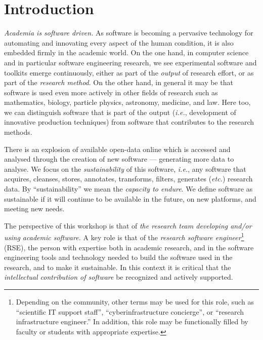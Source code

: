 \documentclass[a4paper,UKenglish]{dagman}
\newcommand{\ie}{\emph{i.e.},\xspace}
\newcommand{\etc}{\emph{etc.}\xspace}
\begin{document}
\tableofcontents

\section{Introduction}

\emph{Academia is software driven.} As software is becoming a pervasive technology for automating and innovating every aspect of the human condition, it is also embedded firmly in the academic world. On the one hand, in computer science and in particular software engineering research, we see experimental software and toolkits emerge continuously, either as part of the \emph{output} of research effort, or as part of the \emph{research method}. On the other hand, in general it may be that software is used even more actively in other fields of research such as mathematics, biology, particle physics, astronomy, medicine, and law. Here too, we can distinguish software that is part of the output (\ie development of innovative production techniques) from software that contributes to the research methods.

There is an explosion of available open-data online which is accessed and analysed through the creation of new software --- generating more data to analyse. We focus on the \emph{sustainability} of this software, \ie any software that acquires, cleanses, stores, annotates, transforms, filters, generates (\etc) research data.
By ``sustainability'' we mean the \emph{capacity to endure}. We define software as sustainable if it will continue to be available in the future, on new platforms, and meeting new needs.


The perspective of this workshop is that of \emph{the research team developing and/or using academic software.}
A key role is that of the \emph{research software engineer}\footnote{Depending on the community, other terms may be used for this role, such as ``scientific IT support staff'', ``cyberinfrastructure concierge'',  or ``research infrastructure engineer.'' In addition, this role may be functionally filled by faculty or students with appropriate expertise.} (RSE), the person with expertise both in academic research, and in the software engineering tools and technology needed to build the software used in the research, and to make it sustainable.
In this context it is critical that the \emph{intellectual contribution of software} be recognized and actively supported.
\end{document}
